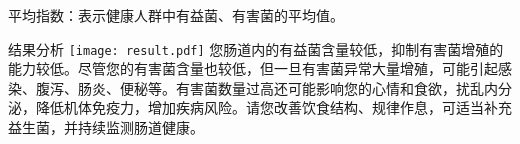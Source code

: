 \vspace*{3mm}

{\qihao 平均指数：表示健康人群中有益菌、有害菌的平均值。}

\vspace*{8mm}

\begin{spacing}{1.5}
\begin{LRaside}[.8]{结果分析}
\noindent
\texttt{[image: result.pdf]}
\asidebreak %
您肠道内的有益菌含量较低，抑制有害菌增殖的能力较低。尽管您的有害菌含量也较低，但一旦有害菌异常大量增殖，可能引起感染、腹泻、肠炎、便秘等。有害菌数量过高还可能影响您的心情和食欲，扰乱内分泌，降低机体免疫力，增加疾病风险。请您改善饮食结构、规律作息，可适当补充益生菌，并持续监测肠道健康。
\end{LRaside}
\end{spacing}


